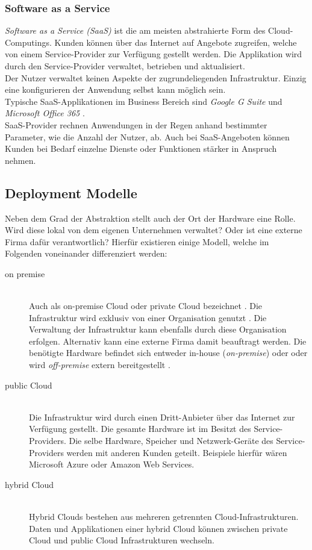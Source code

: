 \subsubsection{Software as a Service}
\textit{Software as a Service (SaaS)} ist die am meisten abstrahierte Form des Cloud-Computings. Kunden können über das Internet auf Angebote zugreifen, welche von einem Service-Provider zur Verfügung gestellt werden. Die Applikation wird durch den Service-Provider verwaltet, betrieben und aktualisiert. \\
Der Nutzer verwaltet keinen Aspekte der zugrundeliegenden Infrastruktur. Einzig eine konfigurieren der Anwendung selbst kann möglich sein.\\
Typische SaaS-Applikationen im Business Bereich sind \textit{Google G Suite} \cite{noauthor_google_nodate}  und \textit{Microsoft Office 365} \cite{noauthor_office_nodate}. \\
SaaS-Provider rechnen Anwendungen in der Regen anhand bestimmter Parameter, wie die Anzahl der Nutzer, ab. Auch bei SaaS-Angeboten können Kunden bei Bedarf einzelne Dienste oder Funktionen stärker in Anspruch nehmen. \cite{wolfgang_herrmann_saas_nodate} \cite{sowmya_layers_2014} \cite{mell_nist_2011}

\subsection{Deployment Modelle}
Neben dem Grad der Abstraktion stellt auch der Ort der Hardware eine Rolle. Wird diese lokal von dem eigenen Unternehmen verwaltet? Oder ist eine externe Firma dafür verantwortlich? Hierfür existieren einige Modell, welche im Folgenden voneinander differenziert werden:
\begin{description}
    \item [on premise] \hfill \\ Auch als on-premise Cloud oder private Cloud bezeichnet \cite{dimpi_rani_rajiv_kumar_ranjan_comparative_2014}. Die Infrastruktur wird exklusiv von einer Organisation genutzt \cite{mell_nist_2011}. Die Verwaltung der Infrastruktur kann ebenfalls durch diese Organisation erfolgen. Alternativ kann eine externe Firma damit beauftragt werden. Die benötigte Hardware befindet sich entweder in-house (\textit{on-premise}) oder oder wird \textit{off-premise} extern bereitgestellt \cite{zwicker_saas_nodate}.
    \item [public Cloud] \hfill \\ Die Infrastruktur wird durch einen Dritt-Anbieter über das Internet zur Verfügung gestellt. Die gesamte Hardware ist im Besitzt des Service-Providers. Die selbe Hardware, Speicher und Netzwerk-Geräte des Service-Providers werden mit anderen Kunden geteilt. Beispiele hierfür wären Microsoft Azure oder Amazon Web Services. \cite{microsoft_public_nodate} \cite{mell_nist_2011}
    \item [hybrid Cloud] \hfill \\ Hybrid Clouds bestehen aus mehreren getrennten Cloud-Infrastrukturen. Daten und Applikationen einer hybrid Cloud können zwischen private Cloud und public Cloud Infrastrukturen wechseln. \cite{mell_nist_2011}
\end{description}

